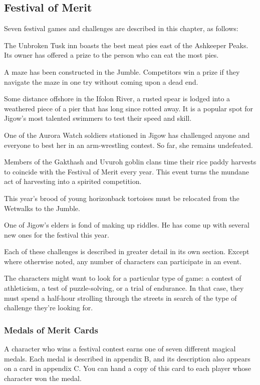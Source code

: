 \documentclass[10pt,a4paper,twoside,twocolumn,openany,nodeprecatedcode]{dndbook}
\begin{document}
\subsection{Festival of Merit}
Seven festival games and challenges are described in this chapter, as follows:


\begin{description}[nolistsep]
\item[J1: Best Pies in the Jumble.]
The Unbroken Tusk inn boasts the best meat pies east of the Ashkeeper Peaks. Its owner has offered a prize to the person who can eat the most pies.
\item[J2: One-Shot Solution.]
A maze has been constructed in the Jumble. Competitors win a prize if they navigate the maze in one try without coming upon a dead end.
\item[J3: The Ifolon Plunge.]
Some distance offshore in the Ifolon River, a rusted spear is lodged into a weathered piece of a pier that has long since rotted away. It is a popular spot for Jigow's most talented swimmers to test their speed and skill.
\item[J4: Call to Arms.]
One of the Aurora Watch soldiers stationed in Jigow has challenged anyone and everyone to best her in an arm-wrestling contest. So far, she remains undefeated.
\item[J5: Wetwalks Paddywhack.]
Members of the Gakthash and Uvuroh goblin clans time their rice paddy harvests to coincide with the Festival of Merit every year. This event turns the mundane act of harvesting into a spirited competition.
\item[J6: Herding the Horizonbacks.]
This year's brood of young horizonback tortoises must be relocated from the Wetwalks to the Jumble.
\item[J7: Riddles and Rhymes.]
One of Jigow's elders is fond of making up riddles. He has come up with several new ones for the festival this year.
\end{description}

Each of these challenges is described in greater detail in its own section. Except where otherwise noted, any number of characters can participate in an event.

The characters might want to look for a particular type of game: a contest of athleticism, a test of puzzle-solving, or a trial of endurance. In that case, they must spend a half-hour strolling through the streets in search of the type of challenge they're looking for.

\subsubsection{Medals of Merit Cards}
A character who wins a festival contest earns one of seven different magical medals. Each medal is described in appendix B, and its description also appears on a card in appendix C. You can hand a copy of this card to each player whose character won the medal.
\end{document}
